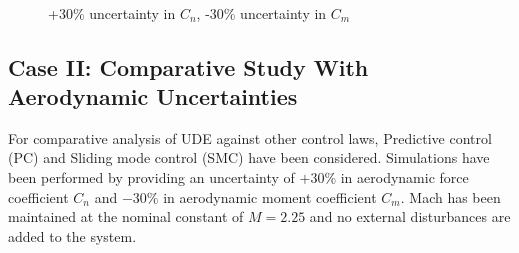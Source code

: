 \documentclass[conference]{IEEEtran}
\begin{document}
	\begin{figure}[h!]
		\centering
		\hfill
		\hfill
		\\	
		\caption{+30\% uncertainty in $C_n$, -30\% uncertainty in $C_m$}
		\label{fig2} 
	\end{figure}
		
	\subsection*{Case II: Comparative Study With Aerodynamic Uncertainties}
		For comparative analysis of UDE against other control laws, Predictive control (PC) and Sliding mode control (SMC) have been considered. Simulations have been performed by providing an uncertainty of $+30\%$ in aerodynamic force coefficient $C_n$ and $-30\%$ in aerodynamic moment coefficient $C_m$. Mach has been maintained at the nominal constant of $M = 2.25$ and no external disturbances are added to the system.
\end{document}
